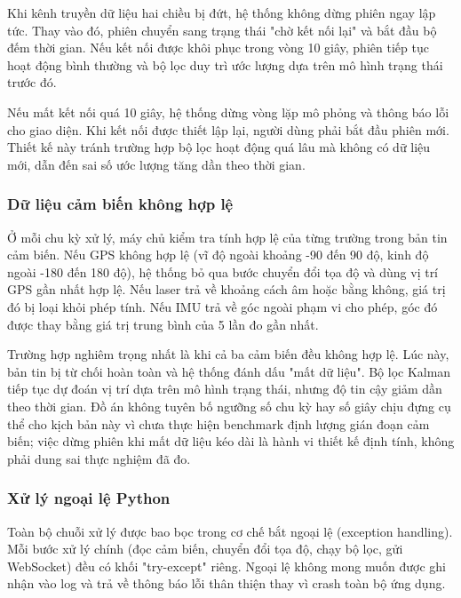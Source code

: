 \hspace{0.5cm} Khi kênh truyền dữ liệu hai chiều bị đứt, hệ thống không dừng phiên ngay lập tức. Thay vào đó, phiên chuyển sang trạng thái "chờ kết nối lại" và bắt đầu bộ đếm thời gian. Nếu kết nối được khôi phục trong vòng 10 giây, phiên tiếp tục hoạt động bình thường và bộ lọc duy trì ước lượng dựa trên mô hình trạng thái trước đó.

Nếu mất kết nối quá 10 giây, hệ thống dừng vòng lặp mô phỏng và thông báo lỗi cho giao diện. Khi kết nối được thiết lập lại, người dùng phải bắt đầu phiên mới. Thiết kế này tránh trường hợp bộ lọc hoạt động quá lâu mà không có dữ liệu mới, dẫn đến sai số ước lượng tăng dần theo thời gian.

\subsubsection{Dữ liệu cảm biến không hợp lệ}

\hspace{0.5cm} Ở mỗi chu kỳ xử lý, máy chủ kiểm tra tính hợp lệ của từng trường trong bản tin cảm biến. Nếu GPS không hợp lệ (vĩ độ ngoài khoảng -90 đến 90 độ, kinh độ ngoài -180 đến 180 độ), hệ thống bỏ qua bước chuyển đổi tọa độ và dùng vị trí GPS gần nhất hợp lệ. Nếu laser trả về khoảng cách âm hoặc bằng không, giá trị đó bị loại khỏi phép tính. Nếu IMU trả về góc ngoài phạm vi cho phép, góc đó được thay bằng giá trị trung bình của 5 lần đo gần nhất.

Trường hợp nghiêm trọng nhất là khi cả ba cảm biến đều không hợp lệ. Lúc này, bản tin bị từ chối hoàn toàn và hệ thống đánh dấu "mất dữ liệu". Bộ lọc Kalman tiếp tục dự đoán vị trí dựa trên mô hình trạng thái, nhưng độ tin cậy giảm dần theo thời gian. Đồ án không tuyên bố ngưỡng số chu kỳ hay số giây chịu đựng cụ thể cho kịch bản này vì chưa thực hiện benchmark định lượng gián đoạn cảm biến; việc dừng phiên khi mất dữ liệu kéo dài là hành vi thiết kế định tính, không phải dung sai thực nghiệm đã đo.

\subsubsection{Xử lý ngoại lệ Python}

\hspace{0.5cm} Toàn bộ chuỗi xử lý được bao bọc trong cơ chế bắt ngoại lệ (exception handling). Mỗi bước xử lý chính (đọc cảm biến, chuyển đổi tọa độ, chạy bộ lọc, gửi WebSocket) đều có khối "try-except" riêng. Ngoại lệ không mong muốn được ghi nhận vào log và trả về thông báo lỗi thân thiện thay vì crash toàn bộ ứng dụng.

